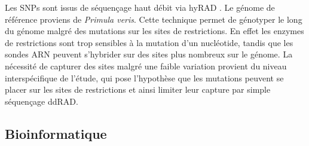 Les SNPs sont issus de séquençage haut débit via hyRAD \citep{Suchan2016}.
 Le génome de référence proviens de \textit{Primula veris}.
 Cette technique permet de génotyper le long du génome malgré des mutations sur les sites de restrictions.
 En effet les enzymes de restrictions sont trop sensibles à la mutation d'un nucléotide, tandis que les sondes ARN peuvent s'hybrider sur des sites plus nombreux sur le génome.
 La nécessité de capturer des sites malgré une faible variation provient du niveau interspécifique de l'étude, qui pose l'hypothèse que les mutations peuvent se placer sur les sites de restrictions et ainsi limiter leur capture par simple séquençage ddRAD.

\subsection{Bioinformatique}

